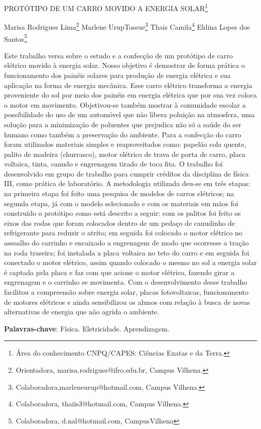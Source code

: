 \documentclass[article,12pt,onesidea,4paper,english,brazil]{abntex2}
\begin{document}
	
	
	\frenchspacing 
	
	\begin{center}
		\LARGE PROTÓTIPO DE UM CARRO MOVIDO A ENERGIA SOLAR\footnote{Área do conhecimento CNPQ/CAPES: Ciências Exatas e da Terra.}
		
		\normalsize
		Marisa Rodrigues Lima\footnote{Orientadora, marisa.rodrigues@ifro.edu.br, Campus Vilhena.} 
		Marlene UrupTossue\footnote{Colaboradora,marleneurup@hotmail.com, Campus Vilhena.} 
		Thais Camila\footnote{Colaboradora, thaiis3@hotmail.com, Campus Vilhena.} 
		Eldina Lopes dos Santos\footnote{Colaboradora, d.nal@hotmail.com, CampusVilhena} 
	\end{center}
	
	\noindent Este trabalho versa sobre o estudo e a confecção de um protótipo de carro elétrico movido à energia solar. Nosso objetivo é demostrar de forma prática o funcionamento dos painéis solares para produção de energia elétrica e sua aplicação na forma de energia mecânica. Esse carro elétrico transforma a energia proveniente do sol por meio dos painéis em energia elétrica que por sua vez coloca o motor em movimento. Objetivou-se também mostrar à comunidade escolar a possibilidade do uso de um automóvel que não libera poluição na atmosfera, uma solução para a minimização de poluentes que prejudica não só a saúde do ser humano como também a preservação do ambiente. Para a confecção do carro foram utilizados materiais simples e reaproveitados como: papelão cola quente, palito de madeira (churrasco), motor elétrico de trava de porta de carro, placa voltaica, tinta, canudo e engrenagem tirado de toca fita. O trabalho foi desenvolvido em grupo de trabalho para cumprir créditos da disciplina de física III, como prática de laboratório. A metodologia utilizada deu-se em três etapas: na primeira etapa foi feito uma pesquisa de modelos de carros elétricos; na segunda etapa, já com o modelo selecionado e com os materiais em mãos foi construído o protótipo como está descrito a seguir: com os palitos foi feito os eixos das rodas que foram colocados dentro de um pedaço de canudinho de refrigerante para reduzir o atrito; em seguida foi colocado o motor elétrico no assoalho do carrinho e encaixado a engrenagem de modo que ocorresse a tração na roda traseira; foi instalada a placa voltaica no teto do carro e em seguida foi conectado o motor elétrico, assim quando colocado o mesmo no sol a energia solar é captada pela placa e faz com que acione o motor elétrico, fazendo girar a engrenagem e o carrinho se movimenta. Com o desenvolvimento desse trabalho facilitou a compreensão sobre energia solar, placas fotovoltaicas, funcionamento de motores elétricos e ainda sensibilizou os alunos com relação à busca de novas alternativas de energia que não agrida o ambiente.
	
	\vspace{\onelineskip}
	
	\noindent
	\textbf{Palavras-chave}: Física. Eletricidade. Aprendizagem.
	
\end{document}
